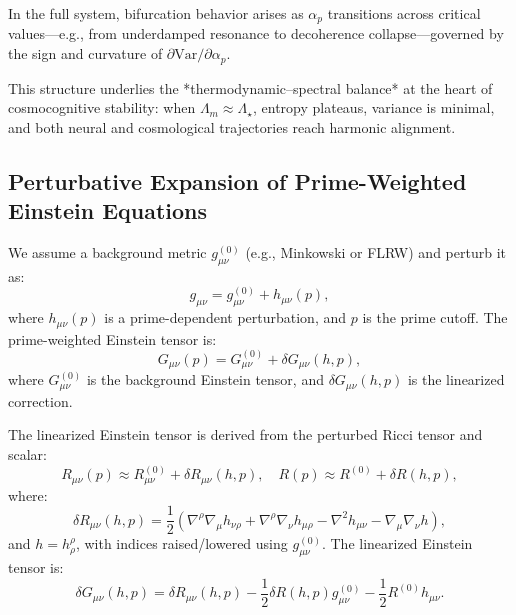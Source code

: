 \documentclass{article}
\theoremstyle{plain}
\theoremstyle{claimstyle}
\begin{document}
In the full system, bifurcation behavior arises as $\alpha_p$ transitions across critical values—e.g., from underdamped resonance to decoherence collapse—governed by the sign and curvature of $\partial \text{Var}/\partial \alpha_p$.

\vspace{0.5em}

This structure underlies the *thermodynamic–spectral balance* at the heart of cosmocognitive stability: when $\Lambda_m \approx \Lambda_\star$, entropy plateaus, variance is minimal, and both neural and cosmological trajectories reach harmonic alignment.

\subsection*{Perturbative Expansion of Prime-Weighted Einstein Equations}

We assume a background metric \( g_{\mu\nu}^{(0)} \) (e.g., Minkowski or FLRW) and perturb it as:
\begin{equation}
g_{\mu\nu} = g_{\mu\nu}^{(0)} + h_{\mu\nu}(p),
\end{equation}
where \( h_{\mu\nu}(p) \) is a prime-dependent perturbation, and \( p \) is the prime cutoff. The prime-weighted Einstein tensor is:
\begin{equation}
G_{\mu\nu}(p) = G_{\mu\nu}^{(0)} + \delta G_{\mu\nu}(h, p),
\end{equation}
where \( G_{\mu\nu}^{(0)} \) is the background Einstein tensor, and \( \delta G_{\mu\nu}(h, p) \) is the linearized correction.

The linearized Einstein tensor is derived from the perturbed Ricci tensor and scalar:
\begin{equation}
R_{\mu\nu}(p) \approx R_{\mu\nu}^{(0)} + \delta R_{\mu\nu}(h, p), \quad R(p) \approx R^{(0)} + \delta R(h, p),
\end{equation}
where:
\begin{equation}
\delta R_{\mu\nu}(h, p) = \frac{1}{2} \left( \nabla^{\rho} \nabla_{\mu} h_{\nu\rho} + \nabla^{\rho} \nabla_{\nu} h_{\mu\rho} - \nabla^{2} h_{\mu\nu} - \nabla_{\mu} \nabla_{\nu} h \right),
\end{equation}
and \( h = h^{\rho}_{\rho} \), with indices raised/lowered using \( g_{\mu\nu}^{(0)} \). The linearized Einstein tensor is:
\begin{equation}
\delta G_{\mu\nu}(h, p) = \delta R_{\mu\nu}(h, p) - \frac{1}{2} \delta R(h, p) g_{\mu\nu}^{(0)} - \frac{1}{2} R^{(0)} h_{\mu\nu}.
\end{equation}
\end{document}
